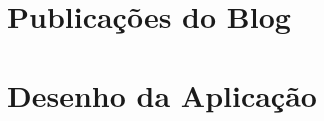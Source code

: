 
\begin{apendicesenv}

\partapendices

\chapter{Publicações do Blog}



\chapter{Desenho da Aplicação}


\end{apendicesenv}
